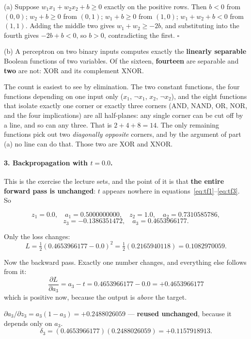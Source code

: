 \documentclass[11pt]{article}
\begin{document}
(a) Suppose $w_1x_1 + w_2x_2 + b \ge 0$ exactly on the positive rows. Then
$b < 0$ from $(0,0)$; $w_2 + b \ge 0$ from $(0,1)$; $w_1 + b \ge 0$ from
$(1,0)$; $w_1 + w_2 + b < 0$ from $(1,1)$. Adding the middle two gives
$w_1 + w_2 \ge -2b$, and substituting into the fourth gives $-2b + b < 0$,
so $b > 0$, contradicting the first. \ensuremath{\square}

(b) A perceptron on two binary inputs computes exactly the
\textbf{linearly separable} Boolean functions of two variables. Of the
sixteen, \textbf{fourteen} are separable and \textbf{two} are not: XOR and
its complement XNOR.

The count is easiest to see by elimination. The two constant functions, the
four functions depending on one input only ($x_1$, $\lnot x_1$, $x_2$,
$\lnot x_2$), and the eight functions that isolate exactly one corner or
exactly three corners (AND, NAND, OR, NOR, and the four implications) are all
half-planes: any single corner can be cut off by a line, and so can any three.
That is $2 + 4 + 8 = 14$. The only remaining functions pick out two
\emph{diagonally opposite} corners, and by the argument of part (a) no line
can do that. Those two are XOR and XNOR.

\paragraph{3. Backpropagation with $t = 0.0$.}

This is the exercise the lecture sets, and the point of it is that
\textbf{the entire forward pass is unchanged}: $t$ appears nowhere in
equations~\eqref{eq:tf1}--\eqref{eq:tf3}. So

\[
  z_1 = 0.0, \quad a_1 = 0.5000000000, \quad
  z_2 = 1.0, \quad a_2 = 0.7310585786,
\]
\[
  z_3 = -0.1386351472, \quad a_3 = 0.4653966177.
\]

Only the loss changes:
\[
  L = \tfrac12(0.4653966177 - 0.0)^2 = \tfrac12(0.2165940118)
    = \mathbf{0.1082970059}.
\]

Now the backward pass. Exactly one number changes, and everything else follows
from it:
\[
  \frac{\partial L}{\partial a_3} = a_3 - t = 0.4653966177 - 0.0
  = \mathbf{+0.4653966177}
\]
which is positive now, because the output is \emph{above} the target.

$\partial a_3/\partial z_3 = a_3(1-a_3) = +0.2488026059$ --- \textbf{reused
unchanged}, because it depends only on $a_3$.
\[
  \delta_3 = (0.4653966177)(0.2488026059) = \mathbf{+0.1157918913}.
\]
\end{document}
